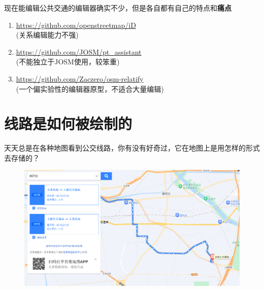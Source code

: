 \documentclass{beamer}
\begin{document}
\begin{frame}

    \quad \quad 现在能编辑公共交通的编辑器确实不少，但是各自都有自己的特点和\textbf{痛点}

    \begin{enumerate}
        \item \url{https://github.com/openstreetmap/iD} \\
        (关系编辑能力不强)
        \item \url{https://github.com/JOSM/pt_assistant} \\
        (不能独立于JOSM使用，较笨重)
        \item \url{https://github.com/Zaczero/osm-relatify} \\
        (一个偏实验性的编辑器原型，不适合大量编辑)
    \end{enumerate}
\end{frame}

\section{线路是如何被绘制的}

\begin{frame}
    \Large
    \quad \quad 天天总是在各种地图看到公交线路，你有没有好奇过，它在地图上是用怎样的形式去存储的？
\end{frame}

\begin{frame}
	\begin{figure}[htpb]
		\centering
		\includegraphics[width=1.05\linewidth]{figure/map_example-baidu-webbus.png}
	\end{figure}
\end{frame}
\end{document}
